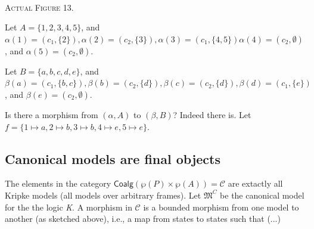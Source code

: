 \begin{minipage}[b]{0.3\linewidth}
\begin{center}
\\
\textsc{Actual Figure 13. } 
\end{center}
\end{minipage}


Let $A = \{1, 2, 3, 4, 5\}$, and $\alpha(1) = (c_1, \{2\}), \alpha(2) = (c_2, \{3\}), \alpha(3) = (c_1, \{4, 5\}) \alpha(4) = (c_2, \emptyset)$, and $\alpha(5) = (c_2, \emptyset)$.

Let $B = \{a, b, c, d, e\}$, and $\beta(a) = (c_1, \{b, c\}), \beta(b) = (c_2, \{d\}), \beta(c) = (c_2, \{d\}), \beta(d) = (c_1, \{e\})$, and $\beta(e) = (c_2, \emptyset)$.

Is there a morphism from $(\alpha, A)$ to $(\beta, B)$? Indeed there is. Let $f = \{1 \mapsto a, 2 \mapsto b, 3 \mapsto b, 4 \mapsto e, 5 \mapsto e\}$.



\subsection{Canonical models are final objects}
The elements in the category $\mathsf{Coalg}(\wp(P)\times\wp(A)) = \mathcal C$ are extactly all Kripke models (all models over arbitrary frames). Let $\mathfrak M^C$ be the canonical model for the the logic \textit{K}. A morphism in $\mathcal C$ is a bounded morphism from one model to another (as sketched above), i.e., a map from states to states such that (...)

